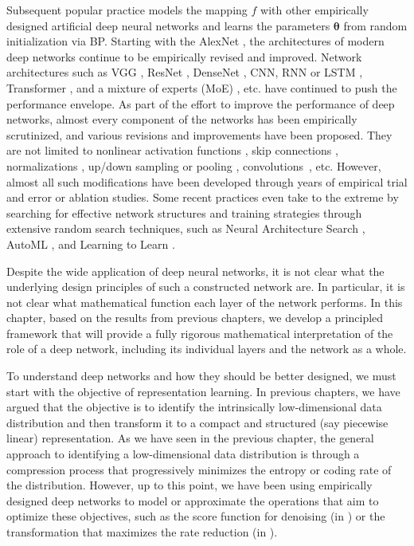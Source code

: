 \documentclass[../../book-main.tex]{subfiles}
\begin{document}
Subsequent popular practice models the mapping $f$ with other empirically designed artificial deep neural networks and learns the parameters $\bm \theta$ from random initialization via BP. Starting with the AlexNet \cite{krizhevsky2012imagenet}, the architectures of modern deep networks continue to be empirically revised and improved. Network architectures such as VGG \cite{simonyan2014very}, ResNet \cite{he2016deep}, DenseNet \cite{dense-net}, CNN, RNN or LSTM \cite{LSTM}, Transformer \cite{vaswani2017attention}, and a mixture of experts (MoE) \cite{MoE,Fedus-2022}, etc. have continued to push the performance envelope. As part of the effort to improve the performance of deep networks, almost every component of the networks has been empirically scrutinized, and various revisions and improvements have been proposed. They are not limited to nonlinear activation functions \cite{maas2013rectifier,klambauer2017self,xu2015empirical,nwankpa2018activation}, skip connections \cite{ronneberger2015u,he2016deep}, normalizations \cite{ioffe2015batch,ba2016layer,ulyanov2016instance,wu2018group,miyato2018spectral}, up/down sampling or pooling \cite{scherer2010evaluation}, convolutions~\cite{lecun1998gradient,krizhevsky2012imagenet}, etc.
However, almost all such modifications have been developed through years of empirical {trial and error} or ablation studies. Some recent practices even take to the extreme by searching for effective network structures and training strategies through extensive random search techniques, such as Neural Architecture Search \cite{NAS-1,Baker2017DesigningNN}, AutoML \cite{automl}, and Learning to Learn \cite{andrychowicz2016learning}. 

Despite the wide application of deep neural networks, it is not clear what the underlying design principles of such a constructed network are. In particular, it is not clear what mathematical function each layer of the network performs. In this chapter, based on the results from previous chapters, we develop a principled framework that will provide a fully rigorous mathematical interpretation of the role of a deep network, including its individual layers and the network as a whole. 

To understand deep networks and how they should be better designed, we must start with the objective of representation learning. In previous chapters, we have argued that the objective is to identify the intrinsically low-dimensional data distribution and then transform it to a compact and structured (say piecewise linear) representation. As we have seen in the previous chapter, the general approach to identifying a low-dimensional data distribution is through a compression process that progressively minimizes the entropy or coding rate of the distribution. However, up to this point, we have been using empirically designed deep networks to model or approximate the operations that aim to optimize these objectives, such as the score function for denoising (in ) or the transformation that maximizes the rate reduction (in ). 
\end{document}
